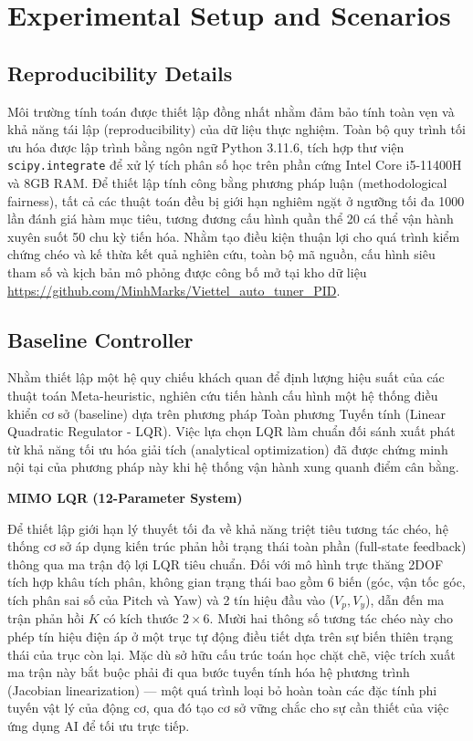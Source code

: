 \documentclass[conference, a4paper]{IEEEtran}
\begin{document}
\section{Experimental Setup and Scenarios}
\subsection{Reproducibility Details}
Môi trường tính toán được thiết lập đồng nhất nhằm đảm bảo tính toàn vẹn và khả năng tái lập (reproducibility) của dữ liệu thực nghiệm. Toàn bộ quy trình tối ưu hóa được lập trình bằng ngôn ngữ Python 3.11.6, tích hợp thư viện \texttt{scipy.integrate} để xử lý tích phân số học trên phần cứng Intel Core i5-11400H và 8GB RAM. Để thiết lập tính công bằng phương pháp luận (methodological fairness), tất cả các thuật toán đều bị giới hạn nghiêm ngặt ở ngưỡng tối đa 1000 lần đánh giá hàm mục tiêu, tương đương cấu hình quần thể 20 cá thể vận hành xuyên suốt 50 chu kỳ tiến hóa. Nhằm tạo điều kiện thuận lợi cho quá trình kiểm chứng chéo và kế thừa kết quả nghiên cứu, toàn bộ mã nguồn, cấu hình siêu tham số và kịch bản mô phỏng được công bố mở tại kho dữ liệu \url{https://github.com/MinhMarks/Viettel_auto_tuner_PID}.

\subsection{Baseline Controller}
Nhằm thiết lập một hệ quy chiếu khách quan để định lượng hiệu suất của các thuật toán Meta-heuristic, nghiên cứu tiến hành cấu hình một hệ thống điều khiển cơ sở (baseline) dựa trên phương pháp Toàn phương Tuyến tính (Linear Quadratic Regulator - LQR). Việc lựa chọn LQR làm chuẩn đối sánh xuất phát từ khả năng tối ưu hóa giải tích (analytical optimization) đã được chứng minh nội tại của phương pháp này khi hệ thống vận hành xung quanh điểm cân bằng.

\textbf{MIMO LQR (12-Parameter System)}

Để thiết lập giới hạn lý thuyết tối đa về khả năng triệt tiêu tương tác chéo, hệ thống cơ sở áp dụng kiến trúc phản hồi trạng thái toàn phần (full-state feedback) thông qua ma trận độ lợi LQR tiêu chuẩn. Đối với mô hình trực thăng 2DOF tích hợp khâu tích phân, không gian trạng thái bao gồm 6 biến (góc, vận tốc góc, tích phân sai số của Pitch và Yaw) và 2 tín hiệu đầu vào ($V_p, V_y$), dẫn đến ma trận phản hồi $K$ có kích thước $2 \times 6$. Mười hai thông số tương tác chéo này cho phép tín hiệu điện áp ở một trục tự động điều tiết dựa trên sự biến thiên trạng thái của trục còn lại. Mặc dù sở hữu cấu trúc toán học chặt chẽ, việc trích xuất ma trận này bắt buộc phải đi qua bước tuyến tính hóa hệ phương trình (Jacobian linearization) — một quá trình loại bỏ hoàn toàn các đặc tính phi tuyến vật lý của động cơ, qua đó tạo cơ sở vững chắc cho sự cần thiết của việc ứng dụng AI để tối ưu trực tiếp.
\end{document}
